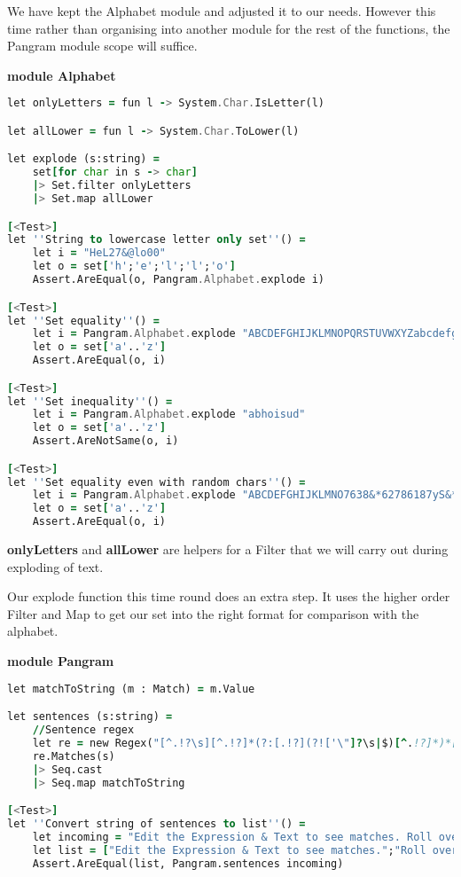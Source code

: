 We have kept the Alphabet module and adjusted it to our needs. However this time rather than
organising into another module for the rest of the functions, the Pangram module scope will suffice.
\bigskip

\textbf{module Alphabet}


\begin{lstlisting}[language=F]
let onlyLetters = fun l -> System.Char.IsLetter(l)

let allLower = fun l -> System.Char.ToLower(l)

let explode (s:string) =
    set[for char in s -> char]
    |> Set.filter onlyLetters
    |> Set.map allLower

[<Test>]
let ''String to lowercase letter only set''() =
    let i = "HeL27&@lo00"
    let o = set['h';'e';'l';'l';'o']
    Assert.AreEqual(o, Pangram.Alphabet.explode i)

[<Test>]
let ''Set equality''() =
    let i = Pangram.Alphabet.explode "ABCDEFGHIJKLMNOPQRSTUVWXYZabcdefghijklmnopqrstuvwxyz"
    let o = set['a'..'z']
    Assert.AreEqual(o, i)

[<Test>]
let ''Set inequality''() =
    let i = Pangram.Alphabet.explode "abhoisud"
    let o = set['a'..'z']
    Assert.AreNotSame(o, i)

[<Test>]
let ''Set equality even with random chars''() =
    let i = Pangram.Alphabet.explode "ABCDEFGHIJKLMNO7638&*62786187yS&*Dg78@198@873**@37PQRSTUVWXYZabcdefghijklmnopqrstuvwxyz"
    let o = set['a'..'z']
    Assert.AreEqual(o, i)
\end{lstlisting}

\textbf{onlyLetters} and \textbf{allLower} are helpers for a Filter that we will carry out during exploding of text.

Our explode function this time round does an extra step. It uses the higher order Filter and Map to get our set into the right format for
comparison with the alphabet.

\bigskip
\textbf{module Pangram}
\begin{lstlisting}[language=F]
let matchToString (m : Match) = m.Value

let sentences (s:string) =
    //Sentence regex
    let re = new Regex("[^.!?\s][^.!?]*(?:[.!?](?!['\"]?\s|$)[^.!?]*)*[.!?]?['\"]?(?=\s|$)")
    re.Matches(s)
    |> Seq.cast
    |> Seq.map matchToString

[<Test>]
let ''Convert string of sentences to list''() =
    let incoming = "Edit the Expression & Text to see matches. Roll over matches or the expression for details. Undo mistakes with cmd-z. Save Favorites & Share expressions with friends or the Community. Explore your results with Tools. A full Reference & Help is available in the Library, or watch the video Tutorial."
    let list = ["Edit the Expression & Text to see matches.";"Roll over matches or the expression for details."; "Undo mistakes with cmd-z."; "Save Favorites & Share expressions with friends or the Community."; "Explore your results with Tools."; "A full Reference & Help is available in the Library, or watch the video Tutorial."]
    Assert.AreEqual(list, Pangram.sentences incoming)
\end{lstlisting}

